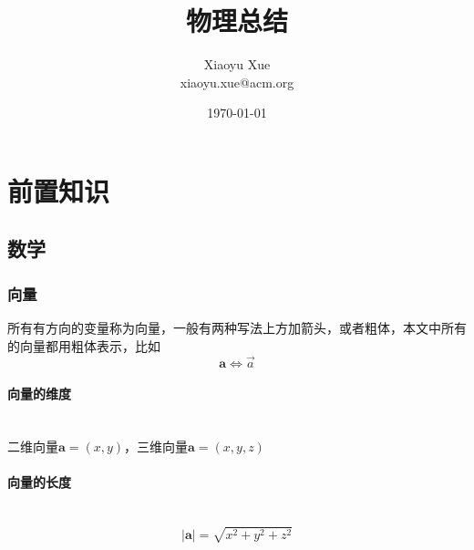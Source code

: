 \documentclass[a4paper, 11pt, oneside]{article}
\title{物理总结}
\author{Xiaoyu Xue \\ xiaoyu.xue@acm.org}
\date{\today}
\newcommand{\bol}[1]{\textbf{#1}}
\begin{document}
\maketitle
\newpage
\tableofcontents
\newpage

\section{前置知识}
\subsection{数学}
\subsubsection{向量}
所有有方向的变量称为向量，一般有两种写法上方加箭头，或者粗体，本文中所有的向量都用粗体表示，比如
\begin{displaymath}
	\bol{a} \Longleftrightarrow \overrightarrow{a}
\end{displaymath}
\paragraph{向量的维度}\quad\\
\indent 二维向量$\bol{a} = (x,y)$，三维向量$\bol{a}=(x,y,z)$\\
\paragraph{向量的长度}\quad\\
\begin{displaymath}
	\vert\bol{a}\vert = \sqrt{x^2 + y^2 + z^2}
\end{displaymath}
\end{document}
